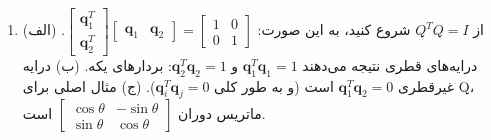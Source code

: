 \documentclass[12pt,a4paper]{article}
\begin{document}
{\begin{enumerate}
			\item از $Q^TQ=I$ شروع کنید، به این صورت: $\begin{bmatrix} \boldsymbol{q}_1^T \\ \boldsymbol{q}_2^T \end{bmatrix} \begin{bmatrix} \boldsymbol{q}_1 & \boldsymbol{q}_2 \end{bmatrix} = \begin{bmatrix} 1 & 0 \\ 0 & 1 \end{bmatrix}$.
			(الف) درایه‌های قطری نتیجه می‌دهند $\boldsymbol{q}_1^T\boldsymbol{q}_1 = 1$ و $\boldsymbol{q}_2^T\boldsymbol{q}_2=1$: بردارهای یکه.
			(ب) درایه غیرقطری $\boldsymbol{q}_1^T\boldsymbol{q}_2=0$ است (و به طور کلی $\boldsymbol{q}_i^T\boldsymbol{q}_j=0$).
			(ج) مثال اصلی برای Q، ماتریس دوران $\begin{bmatrix} \cos\theta & -\sin\theta \\ \sin\theta & \cos\theta \end{bmatrix}$ است.
		\end{enumerate}
	}
\end{document}
